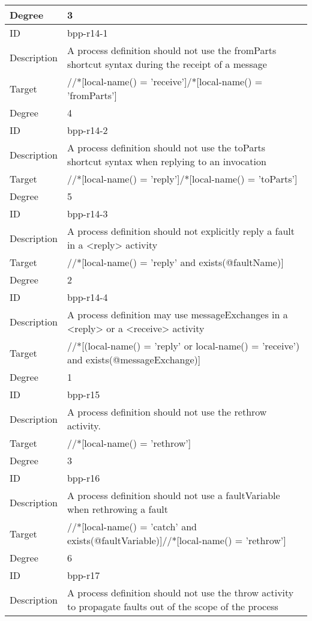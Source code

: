 \begin{center}
\begin{tiny}
\begin{longtable}{p{}|p{}}
Degree & 3\\
\midrule
ID & bpp-r14-1\\
\myrowcolour
Description &A process definition should not use the fromParts shortcut syntax during the receipt of a message\\
Target & //*[local-name() = 'receive']/*[local-name() = 'fromParts']\\
\myrowcolour
Degree & 4\\
\midrule
ID & bpp-r14-2\\
\myrowcolour
Description &A process definition should not use the toParts shortcut syntax when replying to an invocation\\
Target & //*[local-name() = 'reply']/*[local-name() = 'toParts']\\
\myrowcolour
Degree & 5\\
\midrule
ID & bpp-r14-3\\
\myrowcolour
Description &A process definition should not explicitly reply a fault in a <reply> activity\\
Target & //*[local-name() = 'reply' and exists(@faultName)]\\
\myrowcolour
Degree & 2\\
\midrule
ID & bpp-r14-4\\
\myrowcolour
Description &A process definition may use messageExchanges in a <reply> or a <receive> activity\\
Target & //*[(local-name() = 'reply' or local-name() = 'receive') and exists(@messageExchange)]\\
\myrowcolour
Degree & 1\\
\midrule
ID & bpp-r15\\
\myrowcolour
Description &A process definition should not use the rethrow activity.\\
Target & //*[local-name() = 'rethrow']\\
\myrowcolour
Degree & 3\\
\midrule
ID & bpp-r16\\
\myrowcolour
Description &A process definition should not use a faultVariable when rethrowing a fault\\
Target & //*[local-name() = 'catch' and exists(@faultVariable)]//*[local-name() = 'rethrow']\\
\myrowcolour
Degree & 6\\
\midrule
ID & bpp-r17\\
\myrowcolour
Description &A process definition should not use the throw activity to propagate faults out of the scope of the process\\

\end{longtable}
\end{tiny}
\end{center}
